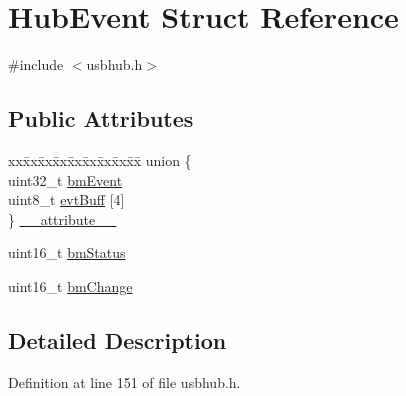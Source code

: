 \hypertarget{struct_hub_event}{\section{\-Hub\-Event \-Struct \-Reference}
\label{struct_hub_event}
}


{\ttfamily \#include $<$usbhub.\-h$>$}

\subsection*{\-Public \-Attributes}
\begin{DoxyCompactItemize}
\item 
\begin{tabbing}
xx\=xx\=xx\=xx\=xx\=xx\=xx\=xx\=xx\=\kill
union \{\\
\>uint32\_t \hyperlink{struct_hub_event_aa7eab68768439ce3a208b3fa4c671a3c}{bmEvent}\\
\>uint8\_t \hyperlink{struct_hub_event_a5a8016b368bc8ac993abae3f97b8306f}{evtBuff} \mbox{[}4\mbox{]}\\
\} \hyperlink{struct_hub_event_a576c08d55d8b308c55fa941f28f20ea8}{\_\_attribute\_\_}\\

\end{tabbing}\item 
uint16\-\_\-t \hyperlink{struct_hub_event_a40dc52f2eb375e6f7ace509a985525ac}{bm\-Status}
\item 
uint16\-\_\-t \hyperlink{struct_hub_event_a9a5761abdc6e8ffc814ba8d3b5b9cd7f}{bm\-Change}
\end{DoxyCompactItemize}


\subsection{\-Detailed \-Description}


\-Definition at line 151 of file usbhub.\-h.



